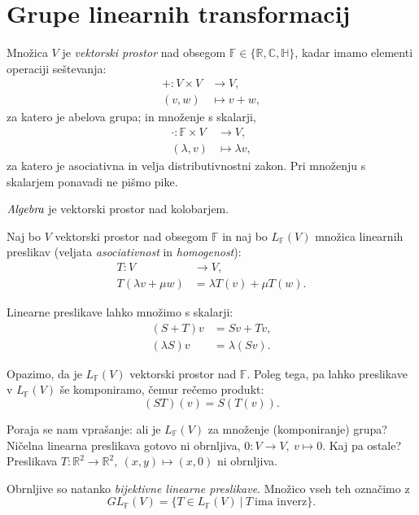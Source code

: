 \pagebreak
\section{Grupe linearnih transformacij}

\begin{defin}
	Mno\v zica $V$ je \emph{vektorski prostor} nad obsegom $\mathbb{F} \in \{\mathbb{R}, \mathbb{C}, \mathbb{H}\}$, kadar imamo
	elementi operaciji se\v stevanja:
	\begin{align*}
		+: V\times V &\to V, \\
		(v, w) &\mapsto v + w,
	\end{align*}
	za katero je abelova grupa; in mno\v zenje s skalarji,
	\begin{align*}
		\cdot: \mathbb{F}\times V &\to V,\\
		(\lambda, v) &\mapsto \lambda v,
	\end{align*}
	za katero je asociativna in velja distributivnostni zakon. Pri mno\v zenju s skalarjem ponavadi ne pi\v smo pike.

	$\emph{Algebra}$ je vektorski prostor nad kolobarjem.
\end{defin}

\ni Naj bo $V$ vektorski prostor nad obsegom $\mathbb{F}$ in naj bo $L_{\mathbb{F}}(V)$ mno\v zica linearnih preslikav (veljata \emph{asociativnost}
in \emph{homogenost}):
\begin{align*}
	T: V &\to V,\\
	T(\lambda v + \mu w) &= \lambda T(v) + \mu T(w).
\end{align*}

\ni Linearne preslikave lahko mno\v zimo s skalarji:
\begin{align*}
	(S + T)v &= Sv + Tv, \\
	(\lambda S)v &= \lambda (Sv).
\end{align*}

\ni Opazimo, da je $L_{\mathbb{F}}(V)$ vektorski prostor nad $\mathbb{F}$. Poleg tega, pa lahko preslikave v $L_{\mathbb{F}}(V)$ \v se komponiramo,
\v cemur re\v cemo produkt:
\[
	(ST)(v) = S (T (v)).
\]

\ni Poraja se nam vpra\v sanje: ali je $L_{\mathbb{F}}(V)$ za mno\v zenje (komponiranje) grupa? Ni\v celna linearna preslikava gotovo ni obrnljiva,
$0: V \to V,\ v \mapsto 0$. Kaj pa ostale? Preslikava $T:\mathbb{R}^2 \to \mathbb{R}^2,\ (x,y) \mapsto (x, 0)$ ni obrnljiva.

Obrnljive so natanko \emph{bijektivne linearne preslikave}. Mno\v zico vseh teh ozna\v cimo z
\[
	GL_{\mathbb{F}}(V) = \{T \in L_{\mathbb{F}}(V)\ |\ T\ \text{ima inverz}\}.
\]

